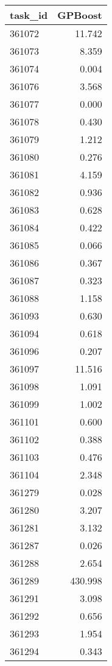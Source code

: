 \begin{tabular}{lr}
\toprule
task\_id & GPBoost \\
\midrule
361072 & 11.742 \\
361073 & 8.359 \\
361074 & 0.004 \\
361076 & 3.568 \\
361077 & 0.000 \\
361078 & 0.430 \\
361079 & 1.212 \\
361080 & 0.276 \\
361081 & 4.159 \\
361082 & 0.936 \\
361083 & 0.628 \\
361084 & 0.422 \\
361085 & 0.066 \\
361086 & 0.367 \\
361087 & 0.323 \\
361088 & 1.158 \\
361093 & 0.630 \\
361094 & 0.618 \\
361096 & 0.207 \\
361097 & 11.516 \\
361098 & 1.091 \\
361099 & 1.002 \\
361101 & 0.600 \\
361102 & 0.388 \\
361103 & 0.476 \\
361104 & 2.348 \\
361279 & 0.028 \\
361280 & 3.207 \\
361281 & 3.132 \\
361287 & 0.026 \\
361288 & 2.654 \\
361289 & 430.998 \\
361291 & 3.098 \\
361292 & 0.656 \\
361293 & 1.954 \\
361294 & 0.343 \\
\bottomrule
\end{tabular}
